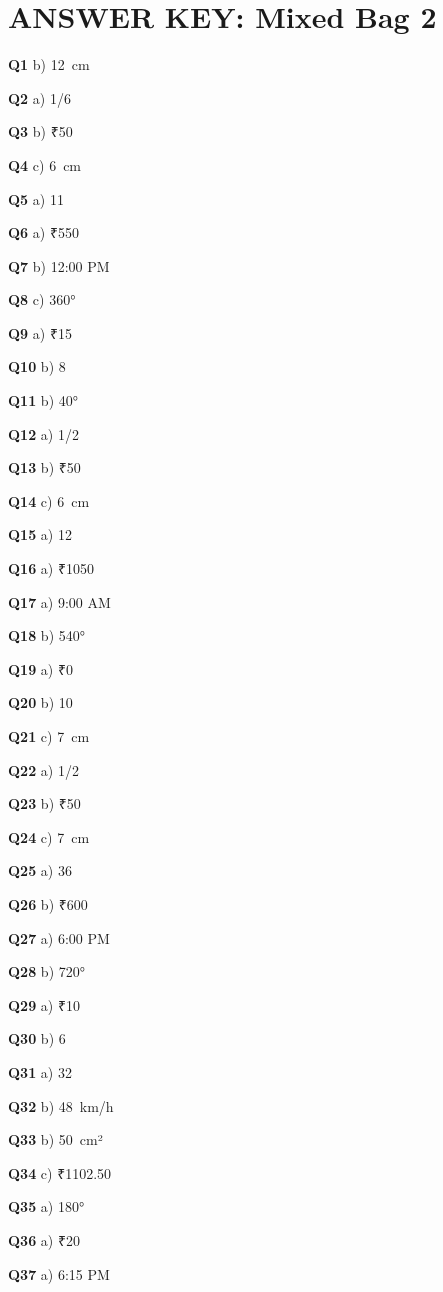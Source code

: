 \section{ANSWER KEY: Mixed Bag 2}

\textbf{Q1} b) 12 cm\par
\textbf{Q2} a) 1/6\par
\textbf{Q3} b) ₹50\par
\textbf{Q4} c) 6 cm\par
\textbf{Q5} a) 11\par
\textbf{Q6} a) ₹550\par
\textbf{Q7} b) 12:00 PM\par
\textbf{Q8} c) 360°\par
\textbf{Q9} a) ₹15\par
\textbf{Q10} b) 8\par
\textbf{Q11} b) 40°\par
\textbf{Q12} a) 1/2\par
\textbf{Q13} b) ₹50\par
\textbf{Q14} c) 6 cm\par
\textbf{Q15} a) 12\par
\textbf{Q16} a) ₹1050\par
\textbf{Q17} a) 9:00 AM\par
\textbf{Q18} b) 540°\par
\textbf{Q19} a) ₹0\par
\textbf{Q20} b) 10\par
\textbf{Q21} c) 7 cm\par
\textbf{Q22} a) 1/2\par
\textbf{Q23} b) ₹50\par
\textbf{Q24} c) 7 cm\par
\textbf{Q25} a) 36\par
\textbf{Q26} b) ₹600\par
\textbf{Q27} a) 6:00 PM\par
\textbf{Q28} b) 720°\par
\textbf{Q29} a) ₹10\par
\textbf{Q30} b) 6\par
\textbf{Q31} a) 32\par
\textbf{Q32} b) 48 km/h\par
\textbf{Q33} b) 50 cm²\par
\textbf{Q34} c) ₹1102.50\par
\textbf{Q35} a) 180°\par
\textbf{Q36} a) ₹20\par
\textbf{Q37} a) 6:15 PM\par
